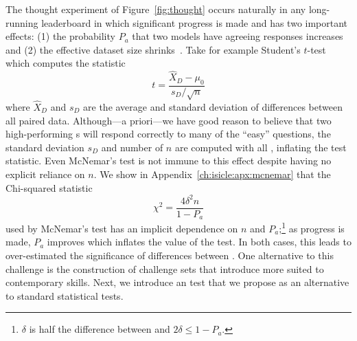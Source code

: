 The thought experiment of Figure~\ref{fig:thought} occurs naturally in any long-running leaderboard in which significant progress is made and has two important effects: (1) the probability $P_a$ that two models have agreeing responses increases and (2) the effective dataset size shrinks~\citep{boydgraber2020nerds}.
Take for example Student's $t$-test which computes the statistic
\begin{equation*}
    t=\frac{\hat{X}_D-\mu_0}{s_D/\sqrt{n}}
\end{equation*}
where $\hat{X}_D$ and $s_D$ are the average and standard deviation of differences between all paired data.
Although---a priori---we have good reason to believe that two high-performing \subj{}s will respond correctly to many of the ``easy'' questions, the standard deviation $s_D$ and number of \itms{} $n$ are computed with all \itms{}, inflating the test statistic.
Even McNemar's test is not immune to this effect despite having no explicit reliance on $n$.
We show in Appendix~\ref{ch:isicle:apx:mcnemar} that the Chi-squared statistic
\begin{equation*}
    \chi^2=\frac{4\delta^2 n}{1-P_a}
\end{equation*}
used by McNemar's test has an implicit dependence on $n$ and $P_a$;\footnote{$\delta$ is half the difference between \subjs{} and $2\delta\le 1-P_a$.} as progress is made, $P_a$ improves which inflates the value of the test.
In both cases, this leads to over-estimated the significance of differences between \subjs{}.
One alternative to this challenge is the construction of challenge sets that introduce \itms{} more suited to contemporary \subj{} skills.
Next, we introduce an \irt{} test that we propose as an alternative to standard statistical tests.



